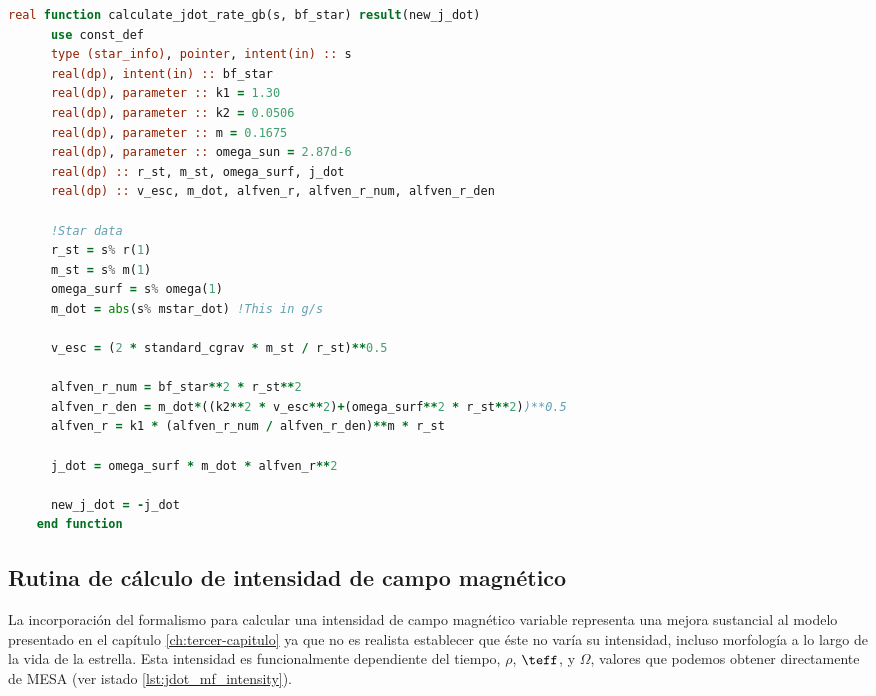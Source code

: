 \begin{lstlisting}[language=Fortran, float, caption={Rutina de par de torsión para un campo magnético de intensidad variable.}, label={lst:jdot_gb}]
	real function calculate_jdot_rate_gb(s, bf_star) result(new_j_dot)
      use const_def
      type (star_info), pointer, intent(in) :: s
      real(dp), intent(in) :: bf_star
      real(dp), parameter :: k1 = 1.30
      real(dp), parameter :: k2 = 0.0506
      real(dp), parameter :: m = 0.1675
      real(dp), parameter :: omega_sun = 2.87d-6
      real(dp) :: r_st, m_st, omega_surf, j_dot
      real(dp) :: v_esc, m_dot, alfven_r, alfven_r_num, alfven_r_den
      
      !Star data
      r_st = s% r(1)
      m_st = s% m(1)
      omega_surf = s% omega(1)
      m_dot = abs(s% mstar_dot) !This in g/s
      
      v_esc = (2 * standard_cgrav * m_st / r_st)**0.5
      
      alfven_r_num = bf_star**2 * r_st**2
      alfven_r_den = m_dot*((k2**2 * v_esc**2)+(omega_surf**2 * r_st**2))**0.5
      alfven_r = k1 * (alfven_r_num / alfven_r_den)**m * r_st
      
      j_dot = omega_surf * m_dot * alfven_r**2
      
      new_j_dot = -j_dot
    end function	
\end{lstlisting}

\subsection{Rutina de cálculo de intensidad de campo magnético}
La incorporación del formalismo para calcular una intensidad de campo magnético variable representa una mejora sustancial al modelo presentado en el capítulo \ref{ch:tercer-capitulo} ya que no es realista establecer que éste no varía su intensidad, incluso morfología a lo largo de la vida de la estrella. Esta intensidad es funcionalmente dependiente del tiempo, $\rho$, $\teff$, y $\Omega$, valores que podemos obtener directamente de MESA (ver istado \ref{lst:jdot_mf_intensity}).\par

